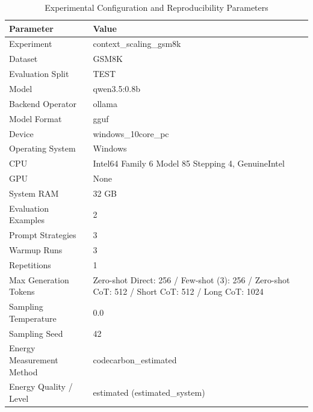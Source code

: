 \begin{table}
\caption{Experimental Configuration and Reproducibility Parameters}
\label{tab:experimental_configuration}
\begin{tabular}{ll}
\toprule
Parameter & Value \\
\midrule
Experiment & context\_scaling\_gsm8k \\
Dataset & GSM8K \\
Evaluation Split & TEST \\
Model & qwen3.5:0.8b \\
Backend Operator & ollama \\
Model Format & gguf \\
Device & windows\_10core\_pc \\
Operating System & Windows \\
CPU & Intel64 Family 6 Model 85 Stepping 4, GenuineIntel \\
GPU & None \\
System RAM & 32 GB \\
Evaluation Examples & 2 \\
Prompt Strategies & 3 \\
Warmup Runs & 3 \\
Repetitions & 1 \\
Max Generation Tokens & Zero-shot Direct: 256 / Few-shot (3): 256 / Zero-shot CoT: 512 / Short CoT: 512 / Long CoT: 1024 \\
Sampling Temperature & 0.0 \\
Sampling Seed & 42 \\
Energy Measurement Method & codecarbon\_estimated \\
Energy Quality / Level & estimated (estimated\_system) \\
\bottomrule
\end{tabular}
\end{table}
